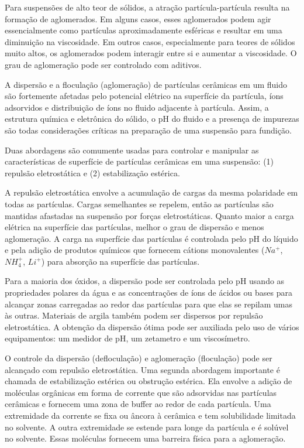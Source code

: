 Para suspensões de alto teor de sólidos, a atração partícula-partícula resulta na formação de aglomerados. Em alguns casos, esses aglomerados podem agir essencialmente como partículas aproximadamente esféricas e resultar em uma diminuição na viscosidade. Em outros casos, especialmente para teores de sólidos muito altos, os aglomerados podem interagir entre si e aumentar a viscosidade. O grau de aglomeração pode ser controlado com aditivos.

A dispersão e a floculação (aglomeração) de partículas cerâmicas em um fluido são fortemente afetadas pelo potencial elétrico na superfície da partícula, íons adsorvidos e distribuição de íons no fluido adjacente à partícula. Assim, a estrutura química e eletrônica do sólido, o pH do fluido e a presença de impurezas são todas considerações críticas na preparação de uma suspensão para fundição.

Duas abordagens são comumente usadas para controlar e manipular as características de superfície de partículas cerâmicas em uma suspensão: (1) repulsão eletrostática e (2) estabilização estérica.

A repulsão eletrostática envolve a acumulação de cargas da mesma polaridade em todas as partículas. Cargas semelhantes se repelem, então as partículas são mantidas afastadas na suspensão por forças eletrostáticas. Quanto maior a carga elétrica na superfície das partículas, melhor o grau de dispersão e menos aglomeração. A carga na superfície das partículas é controlada pelo pH do líquido e pela adição de produtos químicos que fornecem cátions monovalentes ($Na^+$, $NH_4^+$, $Li^+$) para absorção na superfície das partículas.

Para a maioria dos óxidos, a dispersão pode ser controlada pelo pH usando as propriedades polares da água e as concentrações de íons de ácidos ou bases para alcançar zonas carregadas ao redor das partículas para que elas se repilam umas às outras. Materiais de argila também podem ser dispersos por repulsão eletrostática. A obtenção da dispersão ótima pode ser auxiliada pelo uso de vários equipamentos: um medidor de pH, um zetametro e um viscosímetro.

O controle da dispersão (defloculação) e aglomeração (floculação) pode ser alcançado com repulsão eletrostática. Uma segunda abordagem importante é chamada de estabilização estérica ou obstrução estérica. Ela envolve a adição de moléculas orgânicas em forma de corrente que são adsorvidas nas partículas cerâmicas e fornecem uma zona de buffer ao redor de cada partícula. Uma extremidade da corrente se fixa ou âncora à cerâmica e tem solubilidade limitada no solvente. A outra extremidade se estende para longe da partícula e é solúvel no solvente. Essas moléculas fornecem uma barreira física para a aglomeração.

